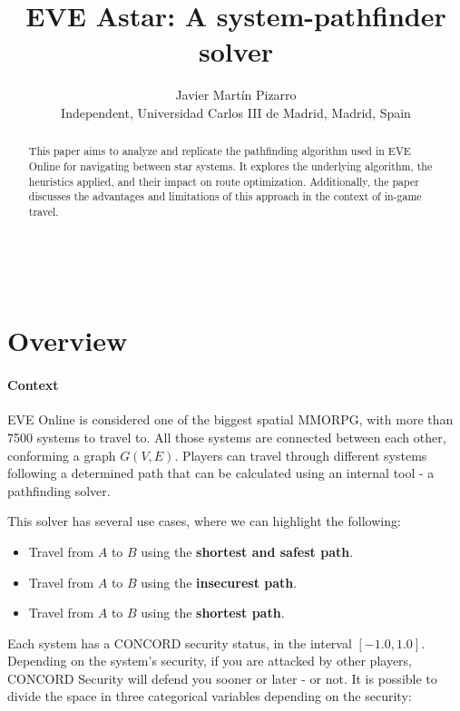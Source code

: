 \documentclass{article}
\title{EVE Astar: A system-pathfinder solver}
\author{Javier Martín Pizarro\\
        \small Independent, Universidad Carlos III de Madrid, Madrid, Spain \\}
\theoremstyle{customdef}
\begin{document}
\maketitle

\begin{abstract} 
\noindent This paper aims to analyze and replicate the pathfinding algorithm used in EVE Online for navigating between star systems. It explores the underlying algorithm, the heuristics applied, and their impact on route optimization. Additionally, the paper discusses the advantages and limitations of this approach in the context of in-game travel. \end{abstract}

\noindent{}\\

\section{Overview}
\paragraph{Context} EVE Online is considered one of the biggest spatial MMORPG, with more than 7500 systems to travel to. All those systems are connected between each other, conforming a graph $G(V,E)$. Players can travel through different systems following a determined path that can be calculated using an internal tool - a pathfinding solver.

This solver has several use cases, where we can highlight the following:

\begin{itemize}
    \item Travel from $A$ to $B$ using the \textbf{shortest and safest path}.
    \item Travel from $A$ to $B$ using the \textbf{insecurest path}.
    \item Travel from $A$ to $B$ using the \textbf{shortest path}.
\end{itemize}

Each system has a CONCORD security status, in the interval $[-1.0, 1.0]$. Depending on the system's security, if you are attacked by other players, CONCORD Security will defend you sooner or later - or not. It is possible to divide the space in three categorical variables depending on the security:
\end{document}
